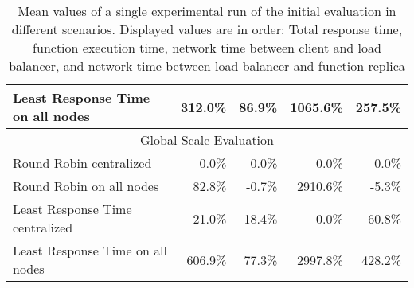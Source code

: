 \begin{table}[]
\begin{tabular}{lrrrr}
Least Response Time on all nodes & 312.0\%                          & 86.9\%                           & 1065.6\%                               & 257.5\%                                \\ \hline
\multicolumn{5}{c}{Global Scale Evaluation}                                                                                                                                              \\ \hline
Round Robin centralized          & 0.0\%                            & 0.0\%                            & 0.0\%                                  & 0.0\%                                  \\
Round Robin on all nodes         & 82.8\%                           & -0.7\%                           & 2910.6\%                               & -5.3\%                                 \\
Least Response Time centralized  & 21.0\%                           & 18.4\%                           & 0.0\%                                  & 60.8\%                                 \\
Least Response Time on all nodes & 606.9\%                          & 77.3\%                           & 2997.8\%                               & 428.2\%                                \\ \hline
\end{tabular}
\caption{Mean values of a single experimental run of the initial evaluation in different scenarios. Displayed values are in order: Total response time, function execution time, network time between client and load balancer, and network time between load balancer and function replica}
\label{tab:initial_eval_results_mean}
\end{table}

